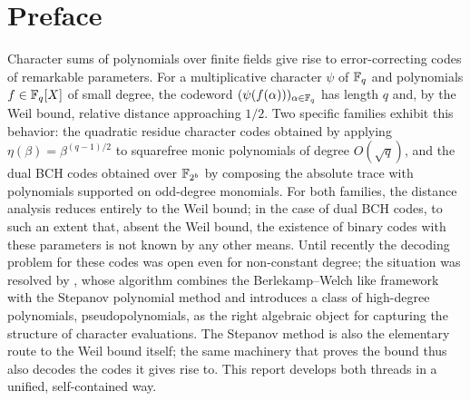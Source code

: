 \chapter*{Preface}
Character sums of polynomials over finite fields give rise to error-correcting codes of remarkable
parameters. For a multiplicative character $\psi$ of $\mathbb{F}_q$ and polynomials $f \in \mathbb{F}_q[X]$ of
small degree, the codeword $(\psi(f(\alpha)))_{\alpha \in \mathbb{F}_q}$ has length $q$ and, by the Weil bound,
relative distance approaching $1/2$. Two specific families exhibit this behavior: the quadratic
residue character codes obtained by applying $\eta(\beta) = \beta^{(q-1)/2}$ to squarefree monic
polynomials of degree $O(\sqrt{q})$, and the dual BCH codes obtained over $\mathbb{F}_{2^b}$ by
composing the absolute trace with polynomials supported on odd-degree monomials. For both
families, the distance analysis reduces entirely to the Weil bound; in the case of dual BCH codes,
to such an extent that, absent the Weil bound, the existence of binary codes with these parameters
is not known by any other means. Until recently the decoding problem for these codes was open
even for non-constant degree; the situation was resolved by \cite{Kopparty2026}, whose
algorithm combines the Berlekamp--Welch like framework with the Stepanov polynomial method and
introduces a class of high-degree polynomials, pseudopolynomials, as the right algebraic object
for capturing the structure of character evaluations. The Stepanov method is also the elementary
route to the Weil bound itself; the same machinery that proves the bound thus also decodes the
codes it gives rise to. This report develops both threads in a unified, self-contained way.

